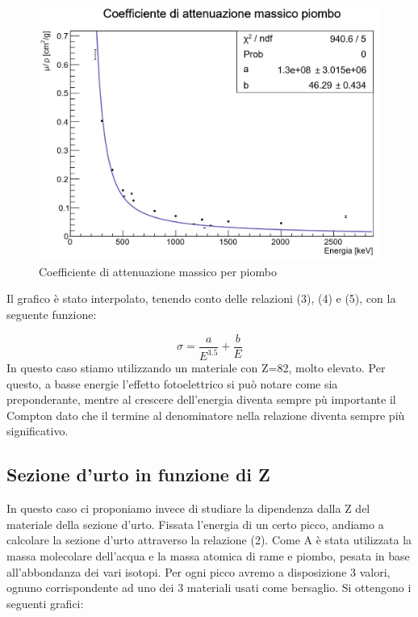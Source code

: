 \documentclass[a4paper,10pt]{article}
\begin{document}
\begin{figure}[H]
    \centering
    \includegraphics[scale=0.6]{grafici/massicopiombo}
    \caption{Coefficiente di attenuazione massico per piombo}
\end{figure}

\noindent Il grafico \`e stato interpolato, tenendo conto delle relazioni (3), (4) e (5), con la seguente funzione:

\begin{equation}
	\sigma = \frac{a}{E^{3.5}} + \frac{b}{E}
\end{equation}
In questo caso stiamo utilizzando un materiale con Z=82, molto elevato. Per questo, a basse energie l'effetto fotoelettrico si pu\`o notare come sia preponderante, mentre al crescere dell'energia diventa sempre p\`u importante il Compton dato che il termine al denominatore nella relazione diventa sempre pi\`u significativo.

\subsection{Sezione d'urto in funzione di Z}
In questo caso ci proponiamo invece di studiare la dipendenza dalla Z del materiale della sezione d'urto. Fissata l'energia di un certo picco, andiamo a calcolare la sezione d'urto attraverso la relazione (2). Come A \`e stata utilizzata la massa molecolare dell'acqua e la massa atomica di rame e piombo, pesata in base all'abbondanza dei vari isotopi. Per ogni picco avremo a disposizione 3 valori, ognuno corrispondente ad uno dei 3 materiali usati come bersaglio. Si ottengono i seguenti grafici:
\end{document}
